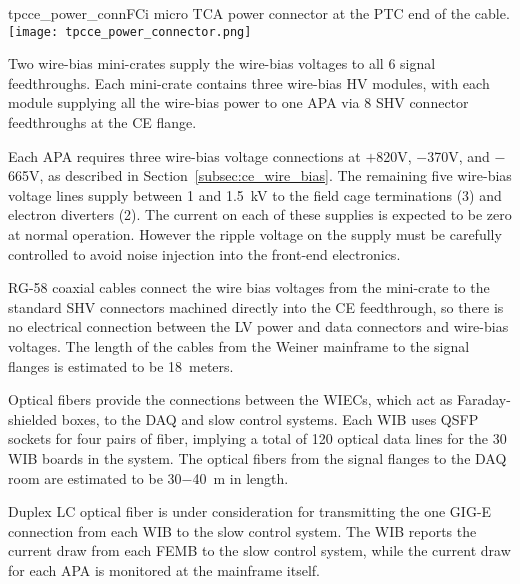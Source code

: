 


\begin{cdrfigure}{tpcce_power_conn}{FCi micro TCA power connector at the PTC end of the cable.}
\texttt{[image: tpcce\_power\_connector.png]} %
\end{cdrfigure}

Two wire-bias mini-crates supply the wire-bias voltages to all 6 signal feedthroughs. Each mini-crate 
contains three wire-bias HV modules, with each module supplying all the wire-bias power to one APA via
8 SHV connector feedthroughs at the CE flange.

Each APA requires three wire-bias voltage connections 
at $+$820V, $-$370V, and $-$665V, as described in Section~\ref{subsec:ce_wire_bias}.
The remaining five wire-bias voltage lines supply between 1 and 1.5~kV to the field cage terminations (3)
and electron diverters (2).
The current on each of these supplies is expected to be zero at normal operation.
However the ripple voltage on the supply must be carefully controlled 
to avoid noise injection into the front-end electronics.

RG-58 coaxial cables connect the wire bias voltages from the mini-crate to the standard SHV
connectors machined directly into the CE feedthrough, so there is no electrical connection between 
the LV power and data connectors and wire-bias voltages. The length of the cables from the Weiner mainframe
to the signal flanges is estimated to be 18~meters.


Optical fibers provide the connections between the WIECs, which act as
Faraday-shielded boxes, to the DAQ and slow control systems.
Each WIB uses QSFP sockets for 
four pairs of fiber, %
implying a total of 120 optical data lines for the 30 WIB boards in the system. The optical fibers from
the signal flanges to the DAQ room are estimated to be 30$-$40~m in length.

Duplex LC optical fiber is under consideration for transmitting the one GIG-E connection from each
WIB to the slow control system. The WIB reports the current draw from each FEMB to the slow control system, while the 
current draw for each APA is monitored at the mainframe itself.

